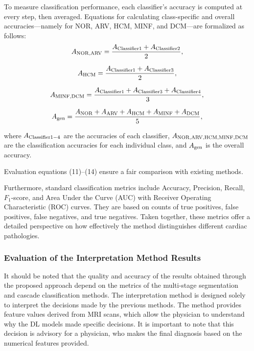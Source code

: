 \documentclass[fleqn,10pt]{wlscirep}
\begin{document}
To measure classification performance, each classifier’s accuracy is computed at every step, then averaged. Equations for calculating class-specific and overall accuracies—namely for NOR, ARV, HCM, MINF, and DCM—are formalized as follows:
\begin{equation}
    {A_{{\rm{NOR}}{\rm{,ARV}}}} = \frac{{{A_{{\rm{Classifier 1}}}} + {A_{{\rm{Classifier 2}}}}}}{2},
\end{equation}

\begin{equation}
    {A_{{\rm{HCM}}}} = \frac{{{A_{{\rm{Classifier 1}}}} + {A_{{\rm{Classifier 3}}}}}}{2},
\end{equation}

\begin{equation}
    {A_{{\rm{MINF}}{\rm{,DCM}}}} = \frac{{{A_{{\rm{Classifier 1}}}} + {A_{{\rm{Classifier 3}}}} + {A_{{\rm{Classifier 4}}}}}}{3},
\end{equation}

\begin{equation}
    {A_{{\rm{gen}}}} = \frac{{{A_{{\rm{NOR}}}} + {A_{{\rm{ARV}}}} + {A_{{\rm{HCM}}}} + {A_{{\rm{MINF}}}} + {A_{{\rm{DCM}}}}}}{5},
\end{equation}

where \({A_{{\rm{Classifier 1 - 4}}}}\) are the accuracies of each classifier, \({A_{{\rm{NOR}}{\rm{, ARV}}{\rm{, HCM}}{\rm{, MINF}}{\rm{, DCM}}}}\) are the classification accuracies for each individual class, and \({A_{{\rm{gen}}}}\) is the overall accuracy.

Evaluation equations (11)–(14) ensure a fair comparison with existing methods.

Furthermore, standard classification metrics include Accuracy, Precision, Recall, \({F_1}\)-score, and Area Under the Curve (AUC) with Receiver Operating Characteristic (ROC) curves. They are based on counts of true positives, false positives, false negatives, and true negatives. Taken together, these metrics offer a detailed perspective on how effectively the method distinguishes different cardiac pathologies.

\subsubsection*{Evaluation of the Interpretation Method Results}

It should be noted that the quality and accuracy of the results obtained through the proposed approach depend on the metrics of the multi-stage segmentation and cascade classification methods. The interpretation method is designed solely to interpret the decisions made by the previous methods. The method provides feature values derived from MRI scans, which allow the physician to understand why the DL models made specific decisions. It is important to note that this decision is advisory for a physician, who makes the final diagnosis based on the numerical features provided.
\end{document}
